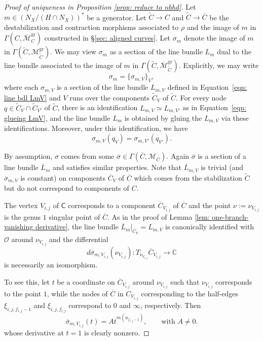 \documentclass{article}
\def\cM{{\overline{\mathcal{M}}}}
\def\cO{\mathcal{O}}
\def\oM{\overline{\mathcal{M}}}
\def\cM{{\mathcal{M}}}
\def\C{\mathbb{C}}
\newcommand{\tropC}{\mathsf{C}}
\newcommand{\gr}{\mathrm{gr}}
\begin{document}
\begin{proof}[Proof of uniqueness in Proposition \ref{prop: reduce to nbhd}]
 
Let $m \in (N_X/(H \cap N_X))^*$ be a generator. Let $\widetilde{C} \to C$ and $\widetilde{C} \to \overline{C}$ be the destabilization and contraction morphisms associated to $\rho$ and the image of $m$ in $\Gamma(C,\oM_C^{\gr})$ constructed in \S\ref{sec: aligned curves}. Let $\sigma_m$ denote the image of $m$ in $\Gamma(\widetilde{C},\mathcal{M}_{\widetilde{C}}^{\mathrm{gr}})$. We may view $\sigma_m$ as a section of the line bundle $L_m$ dual to the line bundle associated to the image of $m$ in $\Gamma(\widetilde{C},\overline{\mathcal{M}}_{\widetilde{C}}^{\mathrm{gr}})$. Explicitly, we may write
\[
\sigma_m=\{\sigma_{m,V}\}_{V},
\]
where each $\sigma_{m,V}$ is a section of the line bundle $L_{m,V}$ defined in Equation~\eqref{eqn: line bdl LmV} and $V$ runs over the components $\widetilde{C}_V$ of $\widetilde{C}$. For every node $q \in \widetilde{C}_V \cap \widetilde{C}_{V'}$ of $\widetilde{C}$, there is an identification
$
L_{m,V} \simeq L_{m,V'}
$
as in Equation~\eqref{eqn: glueing LmV}, and the line bundle $L_m$ is obtained by gluing the $L_{m,V}$ via these identifications. Moreover, under this identification, we have
\[
\sigma_{m,V}(q_V)=\sigma_{m,V'}(q_{V'}).
\]

By assumption, $\sigma$ comes from some $\overline{\sigma} \in \Gamma(\overline{C},\cM_{\overline{C}})$. Again $\overline{\sigma}$ is a section of a line bundle $\overline{L}_m$ and satisfies similar properties. Note that $\overline{L}_{m,V}$ is trivial (and $\overline{\sigma}_{m,V}$ is constant) on components $\overline{C}_V$ of $\overline{C}$ which comes from the stabilization $\widetilde{C}$ but do not correspond to components of $C$. 

The vertex $V_{i,j}$ of $\tropC$ corresponds to a component $\overline{C}_{V_{i,j}}$ of $\overline{C}$ and the point $\nu:=\nu_{V_{i,j}}$ is the genus $1$ singular point of $\overline{C}$. As in the proof of Lemma \ref{lem: one-branch-vanishing derivative}, the line bundle $\overline{L}_m|_{\overline{C}_V}=L_{m,V}$ is canonically identified with $\cO$ around $\nu_{V_{i,j}}$ and the differential
\[
d\overline{\sigma}_{m,V_{i,j}}(\nu_{V_{i,j}})\colon T_{\nu_{V_{i,j}}}\overline{C}_{V_{i,j}} \to \C 
\]
is necessarily an isomorphism.

To see this, let $t$ be a coordinate on $\overline{C}_{V_{i,j}}$ around $\nu_{V_{i,j}}$ such that $\nu_{V_{i,j}}$ corresponds to the point $1$, while the nodes of $\overline{C}$ in $C_{V_{i,j}}$ corresponding to the half-edges $\xi_{i,j,f_{i,j}-1}$ and $\xi_{i,j,f_{i,j}}$ correspond to $0$ and $\infty$, respectively. Then
\[
\overline{\sigma}_{m,V_{i,j}}(t)=A t^{m(u_{f_{i,j}-1})},
\qquad \text{with } A \neq 0.
\]
whose derivative at $t=1$ is clearly nonzero.


\end{proof}
\end{document}
